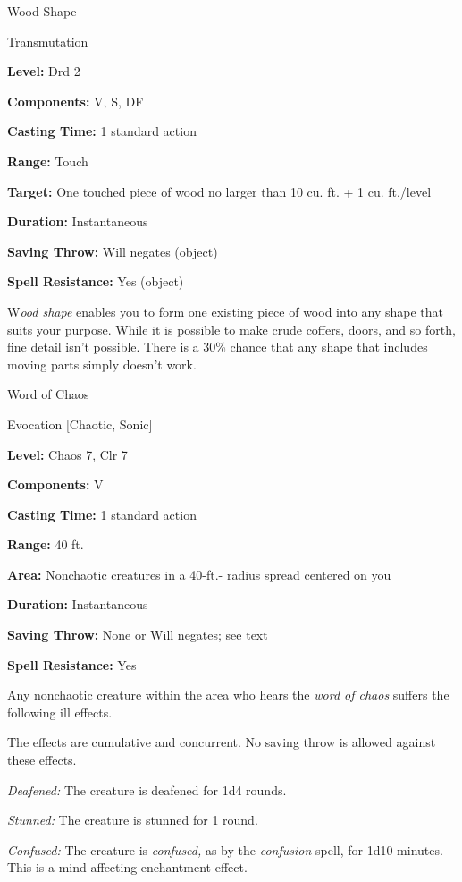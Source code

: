 \documentclass{article}
\begin{document}
\vspace{12pt}
Wood Shape

Transmutation

\textbf{Level:} Drd 2

\textbf{Components:} V, S, DF

\textbf{Casting Time:} 1 standard action

\textbf{Range:} Touch

\textbf{Target:} One touched piece of wood no larger than 10 cu. ft. + 1 cu. ft./level

\textbf{Duration:} Instantaneous

\textbf{Saving Throw: }Will negates (object)

\textbf{Spell Resistance:} Yes (object)

W\textit{ood shape }enables you to form one existing piece of wood into any shape 
that suits your purpose. While it is possible to make crude coffers, doors, and 
so forth, fine detail isn't possible. There is a 30\% chance that any shape that 
includes moving parts simply doesn't work.

\vspace{12pt}
Word of Chaos

Evocation [Chaotic, Sonic]

\textbf{Level:} Chaos 7, Clr 7

\textbf{Components:} V

\textbf{Casting Time:} 1 standard action

\textbf{Range:} 40 ft.

\textbf{Area:} Nonchaotic creatures in a 40-ft.- radius spread centered on you

\textbf{Duration:} Instantaneous

\textbf{Saving Throw:} None or Will negates; see text

\textbf{Spell Resistance:} Yes

Any nonchaotic creature within the area who hears the \textit{word of chaos }suffers 
the following ill effects.

The effects are cumulative and concurrent. No saving throw is allowed against these 
effects.

\textit{Deafened: }The creature is deafened for 1d4 rounds.

\textit{Stunned: }The creature is stunned for 1 round.

\textit{Confused: }The creature is \textit{confused, }as by the \textit{confusion 
}spell, for 1d10 minutes. This is a mind-affecting enchantment effect.
\end{document}
